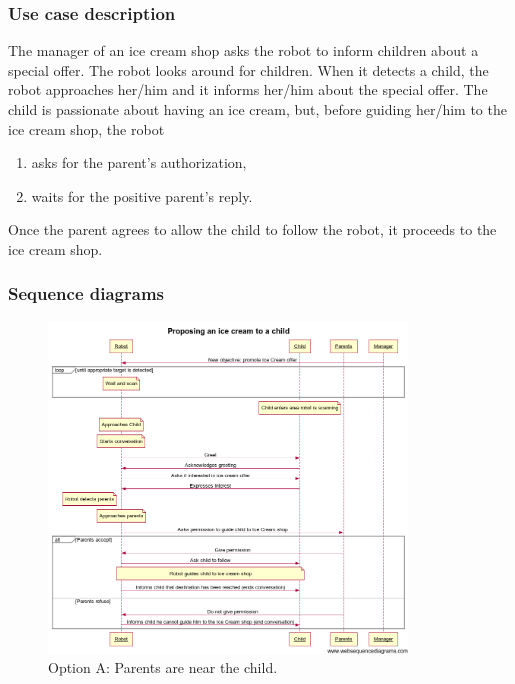 \subsubsection{Use case description}

The manager of an ice cream shop asks the robot to inform children about
a special offer. The robot looks around for children. When it detects
a child, the robot approaches her/him and it informs her/him
about the special offer. The child is passionate about having an ice cream, 
but, before guiding her/him to the ice cream shop, the robot
\begin{enumerate}
\item asks for the parent's authorization,
\item waits for the positive parent's reply.
\end{enumerate}

\noindent Once the parent agrees to allow the child to follow the robot, it proceeds
to the ice cream shop.

\subsubsection{Sequence diagrams}

\begin{figure}[!h]
\includegraphics[width=0.85\textwidth]{iceCreamA}
\protect\caption{Option A: Parents are near the child.}
\end{figure}


